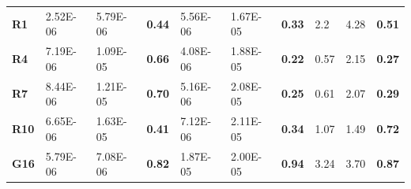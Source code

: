 \documentclass[encoding=utf8,british]{tumphthesis}
\begin{document}
\begin{table}[H]
\begin{subtable}{1\textwidth}
{\begin{tabular}{|l|llr|llr|llr|}
\rowcolor[HTML]{CFE2F3} 
\textbf{R1}                               & 2.52E-06                                             & 5.79E-06                                              & \textbf{0.44}                                    & 5.56E-06                                             & 1.67E-05                                              & \textbf{0.33}                                    & 2.2                                                  & 4.28                                                  & \textbf{0.51}                                    \\
\textbf{R4}                               & 7.19E-06                                             & 1.09E-05                                              & \textbf{0.66}                                    & 4.08E-06                                             & 1.88E-05                                              & \textbf{0.22}                                    & 0.57                                                 & 2.15                                                  & \textbf{0.27}                                    \\
\rowcolor[HTML]{CFE2F3} 
\textbf{R7}                               & 8.44E-06                                             & 1.21E-05                                              & \textbf{0.70}                                    & 5.16E-06                                           & 2.08E-05                                              & \textbf{0.25}                                    & 0.61                                                 & 2.07                                                  & \textbf{0.29}                                    \\
\textbf{R10}                              & 6.65E-06                                             & 1.63E-05                                              & \textbf{0.41}                                    & 7.12E-06                                             & 2.11E-05                                              & \textbf{0.34}                                    & 1.07                                                 & 1.49                                                  & \textbf{0.72}                                    \\
\rowcolor[HTML]{CFE2F3} 
\textbf{G16}                              & 5.79E-06                                             & 7.08E-06                                              & \textbf{0.82}                                    & 1.87E-05                                             & 2.00E-05                                              & \textbf{0.94}                                    & 3.24                                                 & 3.70                                                  & \textbf{0.87}                                    \\ \hline

\end{tabular}}
\end{subtable}
\end{table}
\end{document}
